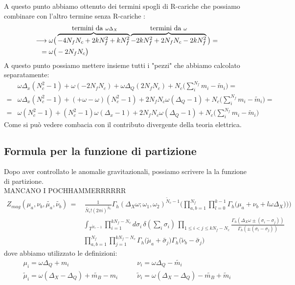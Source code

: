 \documentclass[a4paper,12pt]{article}
\begin{document}
A questo punto abbiamo ottenuto dei termini spogli di R-cariche che possiamo combinare con l'altro termine senza R-cariche :
\begin{align*}
	\longrightarrow & \; \omega \big (  \overbrace{- 4 N_f N_c  + 2 k N_f^2  +   k N_f^2}^{\hbox{ termini da } \omega \Delta_X}  \overbrace{- 2  k N_f^2 + 2 N_f N_c - 2  k N_f^2}^{\hbox{termini da } \omega} \big) = \\
	 = &\; \omega \big (  - 2 N_f N_c  \big)
\end{align*}
A questo punto possiamo mettere insieme tutti i "pezzi" che abbiamo calcolato separatamente:
\begin{align*}
 & \omega \Delta_x ( N_c^2 - 1) + \omega ( - 2 N_f N_c  ) + \omega \Delta_Q ( 2 N_f N_c )  + N_c \big( \sum_i^{N_f} m_i - \tilde m_i  \big) =  \\
 = & \omega \Delta_x ( N_c^2 - 1) + ( + \omega - \omega)  ( N_c^2 -1 ) + 2 N_f N_c  \omega ( \Delta_Q -1 )  +  N_c \big( \sum_i^{N_f} m_i - \tilde m_i  \big) = \\
 = &\omega ( N_c^2 -1 ) + ( N_c^2 - 1) \omega (\Delta_x  - 1 ) + 2 N_f N_c  \omega ( \Delta_Q -1 )  + N_c \big( \sum_i^{N_f} m_i - \tilde m_i  \big)
\end{align*}
Come si può vedere combacia con il contributo divergente della teoria elettrica.\\
\subsection{Formula per la funzione di partizione}
Dopo aver controllato le anomalie gravitazionali, possiamo scrivere la la funzione di partizione.\\
MANCANO I POCHHAMMERRRRRR
\begin{align*}
Z_{mag} ( \mu_a , \nu_b , \tilde{\mu_a}, \tilde{\nu_b} ) \,= & \, \frac{1}{\tilde{N_c}! (2 \pi i )^{\tilde{N_c}}}
 \Gamma_h ( \Delta_X \omega ; \omega_1 , \omega_2)^{ \tilde N_c-1}
\bigg( \prod_{a,b=1}^{N_f}   \prod_{l=0}^{k-1} \Gamma_h \big( \mu_a+  \nu_b + l \omega \Delta_X) \big)  \bigg) \\
&\int_{T^{ \tilde N_c-1}}
\prod_{i=1}^{ kN_f - N_c} d \sigma_i \, \delta( \sum_i \sigma_i) \,
 \prod_{ 1 \leq i<j \leq kN_f - N_c} \frac{ \Gamma_h( \Delta_X \omega \pm (\sigma_i - \sigma_j)) }{ \Gamma_h ( \pm (\sigma_i - \sigma_j) )} \\
 &  \prod_{a,b=1}^{N_f} \prod_{j=1}^{k N_f - N_c} \Gamma_h \big( \tilde \mu_a + \tilde{\sigma_j} \big) \Gamma_h \big( \tilde \nu_b - \tilde{\sigma_j} \big)
\end{align*}
dove abbiamo utilizzato le definizioni:
\begin{align*}
 \mu_i = \omega \Delta_Q + m_i  &\qquad \nu_i = \omega \Delta_Q - \tilde{m_i}\\
 \tilde \mu_i = \omega ( \Delta_X - \Delta_Q ) + \tilde{m_B} - m_i  &  \qquad \tilde \nu_i = \omega ( \Delta_X - \Delta_Q ) - \tilde{m_B} + \tilde m_i
\end{align*}
\end{document}
